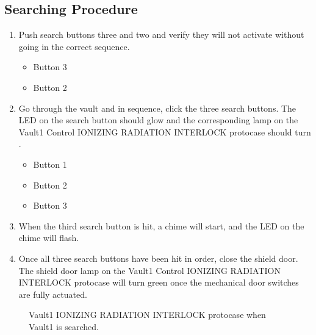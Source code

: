 \documentclass[letterpaper,10pt,english]{sphinxmanual}
\begin{document}
\subsection{Searching Procedure}
\label{\detokenize{testing_documentation/Vault-1_ionizing_radiation:searching-procedure}}\begin{enumerate}
%
\item {} 
\sphinxAtStartPar
Push search buttons three and two and verify they will not activate without going in the correct sequence.
\begin{itemize}
\item {} 
\sphinxAtStartPar
Button 3

\item {} 
\sphinxAtStartPar
Button 2

\end{itemize}

\item {} 
\sphinxAtStartPar
Go through the vault and in sequence, click the three search buttons.
The LED on the search button should glow and the corresponding lamp on the Vault\sphinxhyphen{}1 Control IONIZING RADIATION INTERLOCK protocase should turn .
\begin{itemize}
\item {} 
\sphinxAtStartPar
Button 1

\item {} 
\sphinxAtStartPar
Button 2

\item {} 
\sphinxAtStartPar
Button 3

\end{itemize}

\item {} 
\sphinxAtStartPar
When the third search button is hit, a chime will start, and the LED on the chime will flash.

\item {} 
\sphinxAtStartPar
Once all three search buttons have been hit in order, close the shield door.
The shield door lamp on the Vault\sphinxhyphen{}1 Control IONIZING RADIATION INTERLOCK protocase will turn green once the mechanical door switches are fully actuated.

\end{enumerate}

\begin{figure}[htbp]
\centering
\capstart

\noindent{}
\caption{ Vault\sphinxhyphen{}1 IONIZING RADIATION INTERLOCK protocase when Vault\sphinxhyphen{}1 is searched.}\label{\detokenize{testing_documentation/Vault-1_ionizing_radiation:id2}}\end{figure}
\end{document}
